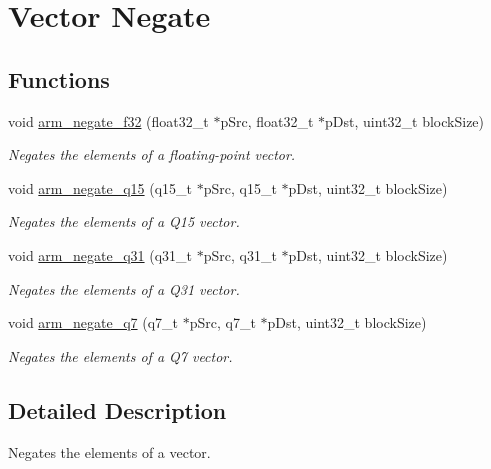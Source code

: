 \hypertarget{group__negate}{\section{Vector Negate}
\label{group__negate}
}
\subsection*{Functions}
\begin{DoxyCompactItemize}
\item 
void \hyperlink{group__negate_ga2e169c4de6cc6e3ba4be9473531e6657}{arm\-\_\-negate\-\_\-f32} (float32\-\_\-t $\ast$p\-Src, float32\-\_\-t $\ast$p\-Dst, uint32\-\_\-t block\-Size)
\begin{DoxyCompactList}\small\item\em Negates the elements of a floating-\/point vector. \end{DoxyCompactList}\item 
void \hyperlink{group__negate_ga0239a833d72cf00290b9723c394e5042}{arm\-\_\-negate\-\_\-q15} (q15\-\_\-t $\ast$p\-Src, q15\-\_\-t $\ast$p\-Dst, uint32\-\_\-t block\-Size)
\begin{DoxyCompactList}\small\item\em Negates the elements of a Q15 vector. \end{DoxyCompactList}\item 
void \hyperlink{group__negate_ga2784c6887686a73dc7c364e2e41c776c}{arm\-\_\-negate\-\_\-q31} (q31\-\_\-t $\ast$p\-Src, q31\-\_\-t $\ast$p\-Dst, uint32\-\_\-t block\-Size)
\begin{DoxyCompactList}\small\item\em Negates the elements of a Q31 vector. \end{DoxyCompactList}\item 
void \hyperlink{group__negate_gaae78fc079a43bdaa3055f9b32e2a1f4c}{arm\-\_\-negate\-\_\-q7} (q7\-\_\-t $\ast$p\-Src, q7\-\_\-t $\ast$p\-Dst, uint32\-\_\-t block\-Size)
\begin{DoxyCompactList}\small\item\em Negates the elements of a Q7 vector. \end{DoxyCompactList}\end{DoxyCompactItemize}


\subsection{Detailed Description}
Negates the elements of a vector.



